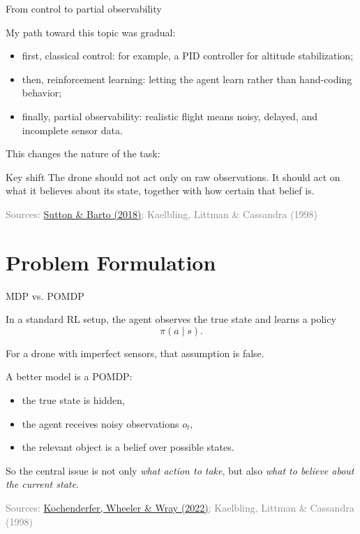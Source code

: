\documentclass[11pt]{beamer}
\newcommand{\srcSuttonBarto}{\href{http://incompleteideas.net/book/the-book.html}{Sutton \& Barto (2018)}}
\newcommand{\srcKochenderferADM}{\href{https://algorithmsbook.com}{Kochenderfer, Wheeler \& Wray (2022)}}
\newcommand{\srcKaelbling}{Kaelbling, Littman \& Cassandra (1998)}
\newcommand{\SourceLine}[1]{\vfill{\tiny\textcolor{gray}{Sources: #1}}}
\begin{document}
\begin{frame}{From control to partial observability}

My path toward this topic was gradual:
\begin{itemize}
  \item first, classical control: for example, a PID controller for altitude stabilization;
  \item then, reinforcement learning: letting the agent learn rather than hand-coding behavior;
  \item finally, partial observability: realistic flight means noisy, delayed, and incomplete sensor data.
\end{itemize}

\medskip
This changes the nature of the task:
\begin{block}{Key shift}
The drone should not act only on raw observations. It should act on what it believes about its state, together with how certain that belief is.
\end{block}

\SourceLine{\srcSuttonBarto; \srcKaelbling}
\end{frame}


\section{Problem Formulation}


\begin{frame}{MDP vs. POMDP}

In a standard RL setup, the agent observes the true state and learns a policy
\[
\pi(a \mid s).
\]

For a drone with imperfect sensors, that assumption is false.

\medskip
A better model is a POMDP:
\begin{itemize}
  \item the true state is hidden,
  \item the agent receives noisy observations $o_t$,
  \item the relevant object is a belief over possible states.
\end{itemize}

\medskip
So the central issue is not only \emph{what action to take}, but also \emph{what to believe about the current state}.

\SourceLine{\srcKochenderferADM; \srcKaelbling}
\end{frame}
\end{document}
